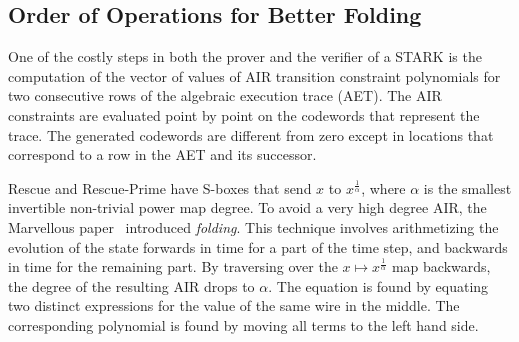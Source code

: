\documentclass[a4paper]{article}
\begin{document}
\subsection{Order of Operations for Better Folding}

One of the costly steps in both the prover and the verifier of a STARK is the computation of the vector of values of AIR transition constraint polynomials for two consecutive rows of the algebraic execution trace (AET). The AIR constraints are evaluated point by point on the codewords that represent the trace. The generated codewords are different from zero except in locations that correspond to a row in the AET and its successor.

Rescue and Rescue-Prime have S-boxes that send $x$ to $x^{\frac{1}{\alpha}}$, where $\alpha$ is the smallest invertible non-trivial power map degree. To avoid a very high degree AIR, the Marvellous paper~\cite{cryptoeprint:2019/426} introduced \emph{folding}. This technique involves arithmetizing the evolution of the state forwards in time for a part of the time step, and backwards in time for the remaining part. By traversing over the $x \mapsto x^{\frac{1}{\alpha}}$ map backwards, the degree of the resulting AIR drops to $\alpha$. The equation is found by equating two distinct expressions for the value of the same wire in the middle. The corresponding polynomial is found by moving all terms to the left hand side.
\end{document}
